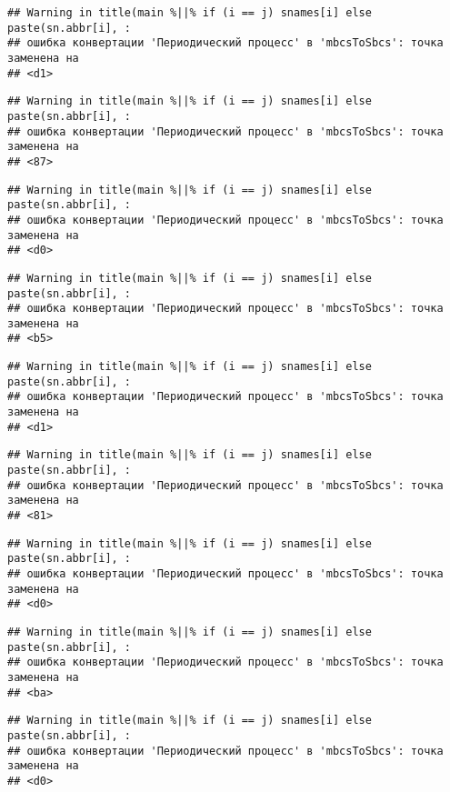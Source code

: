 \documentclass[
]{article}
\begin{document}
\begin{verbatim}
## Warning in title(main %||% if (i == j) snames[i] else paste(sn.abbr[i], :
## ошибка конвертации 'Периодический процесс' в 'mbcsToSbcs': точка заменена на
## <d1>
\end{verbatim}

\begin{verbatim}
## Warning in title(main %||% if (i == j) snames[i] else paste(sn.abbr[i], :
## ошибка конвертации 'Периодический процесс' в 'mbcsToSbcs': точка заменена на
## <87>
\end{verbatim}

\begin{verbatim}
## Warning in title(main %||% if (i == j) snames[i] else paste(sn.abbr[i], :
## ошибка конвертации 'Периодический процесс' в 'mbcsToSbcs': точка заменена на
## <d0>
\end{verbatim}

\begin{verbatim}
## Warning in title(main %||% if (i == j) snames[i] else paste(sn.abbr[i], :
## ошибка конвертации 'Периодический процесс' в 'mbcsToSbcs': точка заменена на
## <b5>
\end{verbatim}

\begin{verbatim}
## Warning in title(main %||% if (i == j) snames[i] else paste(sn.abbr[i], :
## ошибка конвертации 'Периодический процесс' в 'mbcsToSbcs': точка заменена на
## <d1>
\end{verbatim}

\begin{verbatim}
## Warning in title(main %||% if (i == j) snames[i] else paste(sn.abbr[i], :
## ошибка конвертации 'Периодический процесс' в 'mbcsToSbcs': точка заменена на
## <81>
\end{verbatim}

\begin{verbatim}
## Warning in title(main %||% if (i == j) snames[i] else paste(sn.abbr[i], :
## ошибка конвертации 'Периодический процесс' в 'mbcsToSbcs': точка заменена на
## <d0>
\end{verbatim}

\begin{verbatim}
## Warning in title(main %||% if (i == j) snames[i] else paste(sn.abbr[i], :
## ошибка конвертации 'Периодический процесс' в 'mbcsToSbcs': точка заменена на
## <ba>
\end{verbatim}

\begin{verbatim}
## Warning in title(main %||% if (i == j) snames[i] else paste(sn.abbr[i], :
## ошибка конвертации 'Периодический процесс' в 'mbcsToSbcs': точка заменена на
## <d0>
\end{verbatim}
\end{document}
